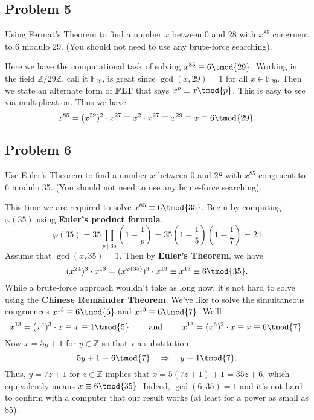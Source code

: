 \documentclass[../hw_sols.tex]{subfiles}
\begin{document}
\subsection*{Problem 5}

Using Fermat's Theorem to find a number $x$ between 0 and 28 with $x^{85}$ 
congruent to 6 modulo 29. (You should not need to use any brute-force 
searching).

\begin{solution}
Here we have the computational task of solving $x^{85} \equiv 6 \tmod{29}$. 
Working in the field $\mathbb{Z}/29\mathbb{Z}$, call it $\mathbb{F}_{29}$, is 
great since $\gcd(x,29) = 1$ for all $x \in \mathbb{F}_{29}$. Then we state an 
alternate form of \textbf{FLT} that says $x^p \equiv x \tmod{p}$. This is easy 
to see via multiplication. Thus we have
	$$x^{85} = (x^{29})^2 \cdot x^{27} \equiv x^2 \cdot x^{27} 
	\equiv x^{29} \equiv x \equiv 6 \tmod{29}.$$
\end{solution}


\newpage



\subsection*{Problem 6}

Use Euler's Theorem to find a number $x$ between 0 and 28 with $x^{85}$ 
congruent to 6 modulo 35. (You should not need to use any brute-force 
searching).

\begin{solution}

This time we are required to solve $x^{85} \equiv 6 \tmod{35}$. Begin by 
computing $\varphi(35)$ using \textbf{Euler's product formula}.
	$$\varphi(35) 
	= 35 \prod_{p \mid 35} \left( 1 - \frac{1}{p} \right) 
	= 35 \left( 1 - \frac{1}{5} \right) \left( 1 - \frac{1}{7} \right) 
	= 24$$
Assume that $\gcd(x,35) = 1$. Then by \textbf{Euler's Theorem}, we have 
	$$(x^{24})^3 \cdot x^{13}
	 = (x^{\varphi(35)})^3 \cdot x^{13} 
	\equiv x^{13} \equiv 6 \tmod{35}.$$
While a brute-force approach wouldn't take as long now, it's not hard to solve 
using the \textbf{Chinese Remainder Theorem}. We've like to solve the 
simultaneous congruences 
$x^{13} \equiv 6 \tmod{5}$ and $x^{13} \equiv 6 \tmod{7}$. We'll
	$$x^{13} = (x^4)^3 \cdot x \equiv x \equiv 1 \tmod{5} \qquad 
	\text{ and } 
	\qquad x^{13} = (x^6)^2 \cdot x \equiv x \equiv 6 \tmod{7}.$$
Now $x = 5y + 1$ for $y \in \mathbb{Z}$ so that via substitution 
	$$5y + 1 \equiv 6 \tmod{7} 
	\quad \Rightarrow \quad 
	y \equiv 1 \tmod{7}.$$
Thus, $y = 7z + 1$ for $z \in \mathbb{Z}$ implies that 
$x = 5(7z+1) + 1 = 35z + 6$, which equivalently means $x \equiv 6 \tmod{35}$. 
Indeed, $\gcd(6,35) = 1$ and it's not hard to confirm with a computer that 
our result works (at least for a power as small as 85).

\end{solution}
\end{document}

